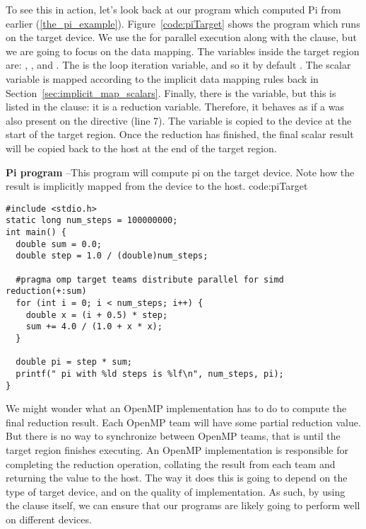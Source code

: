 To see this in action, let's look back at our program which computed Pi from earlier (\ref{the_pi_example}).
Figure~\ref{code:piTarget} shows the program which runs on the target device.
We use the \BUD for parallel execution along with the  clause, but we are going to focus on the data mapping.
The variables inside the target region are: , , and .
The  is the loop iteration variable, and so it by default .
The  scalar variable is mapped  according to the implicit data mapping rules back in Section~\ref{sec:implicit_map_scalars}.
Finally, there is the  variable, but this is listed in the  clause: it is a reduction variable.
Therefore, it behaves as if a  was also present on the directive (line 7).
The variable is copied to the device at the start of the target region.
Once the reduction has finished, the final scalar result will be copied back to the host at the end of the target region.

\begin{CodeExample}%
{\textbf{Pi program} --\small This program will compute pi on the target device.
Note how the result is implicitly mapped from the device to the host.
}%
{code:piTarget}
\begin{lstlisting}
#include <stdio.h>
static long num_steps = 100000000;
int main() {
  double sum = 0.0;
  double step = 1.0 / (double)num_steps;

  #pragma omp target teams distribute parallel for simd reduction(+:sum)
  for (int i = 0; i < num_steps; i++) {
    double x = (i + 0.5) * step;
    sum += 4.0 / (1.0 + x * x);
  }

  double pi = step * sum;
  printf(" pi with %ld steps is %lf\n", num_steps, pi);
}
\end{lstlisting}
\end{CodeExample}

We might wonder what an OpenMP implementation has to do to compute the final reduction result.
Each OpenMP team will have some partial reduction value.
But there is no way to synchronize between OpenMP teams, that is until the target region finishes executing.
An OpenMP implementation is responsible for completing the reduction operation, collating the result from each team and returning the value to the host.
The way it does this is going to depend on the type of target device, and on the quality of implementation.
As such, by using the  clause itself, we can ensure that our programs are likely going to perform well on different devices.

